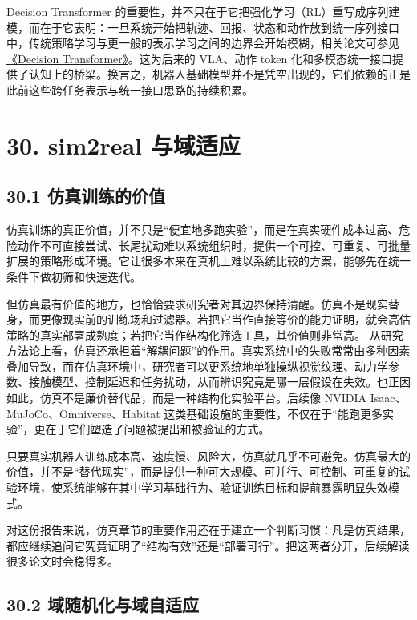 Decision Transformer 的重要性，并不只在于它把强化学习（RL）重写成序列建模，而在于它表明：一旦系统开始把轨迹、回报、状态和动作放到统一序列接口中，传统策略学习与更一般的表示学习之间的边界会开始模糊，相关论文可参见 \href{https://arxiv.org/abs/2106.01345}{《Decision Transformer》}。这为后来的 VLA、动作 token 化和多模态统一接口提供了认知上的桥梁。换言之，机器人基础模型并不是凭空出现的，它们依赖的正是此前这些跨任务表示与统一接口思路的持续积累。

\section*{30. sim2real 与域适应}

\subsection*{30.1 仿真训练的价值}


仿真训练的真正价值，并不只是“便宜地多跑实验”，而是在真实硬件成本过高、危险动作不可直接尝试、长尾扰动难以系统组织时，提供一个可控、可重复、可批量扩展的策略形成环境。它让很多本来在真机上难以系统比较的方案，能够先在统一条件下做初筛和快速迭代。

但仿真最有价值的地方，也恰恰要求研究者对其边界保持清醒。仿真不是现实替身，而更像现实前的训练场和过滤器。若把它当作直接等价的能力证明，就会高估策略的真实部署成熟度；若把它当作结构化筛选工具，其价值则非常高。 从研究方法论上看，仿真还承担着“解耦问题”的作用。真实系统中的失败常常由多种因素叠加导致，而在仿真环境中，研究者可以更系统地单独操纵视觉纹理、动力学参数、接触模型、控制延迟和任务扰动，从而辨识究竟是哪一层假设在失效。也正因如此，仿真不是廉价替代品，而是一种结构化实验平台。后续像 NVIDIA Isaac、MuJoCo、Omniverse、Habitat 这类基础设施的重要性，不仅在于“能跑更多实验”，更在于它们塑造了问题被提出和被验证的方式。

只要真实机器人训练成本高、速度慢、风险大，仿真就几乎不可避免。仿真最大的价值，并不是“替代现实”，而是提供一种可大规模、可并行、可控制、可重复的试验环境，使系统能够在其中学习基础行为、验证训练目标和提前暴露明显失效模式。

对这份报告来说，仿真章节的重要作用还在于建立一个判断习惯：凡是仿真结果，都应继续追问它究竟证明了“结构有效”还是“部署可行”。把这两者分开，后续解读很多论文时会稳得多。

\subsection*{30.2 域随机化与域自适应}


